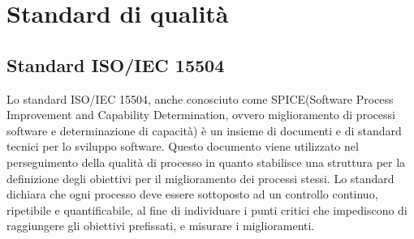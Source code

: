 \newpage
\appendix
\section{Standard di qualità} %

\subsection{Standard ISO/IEC 15504} %
Lo standard ISO/IEC 15504, anche conosciuto come SPICE(Software Process Improvement and Capability Determination, ovvero miglioramento di processi software e determinazione di capacità) è un insieme di documenti e di standard tecnici per lo sviluppo software.
Questo documento viene utilizzato nel perseguimento della qualità di processo in quanto stabilisce una struttura per la definizione degli obiettivi per il miglioramento dei processi stessi.
Lo standard dichiara che ogni processo deve essere sottoposto ad un controllo continuo, ripetibile e quantificabile, al fine di individuare i punti critici che impediscono di raggiungere gli obiettivi prefissati, e misurare i miglioramenti.


